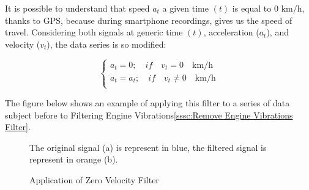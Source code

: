 \documentclass[tesi]{subfiles}
\begin{document}
It is possible to  understand that speed $a_{t}$ a given time $(t)$ is equal to $0$ $\si{\km\per\hour}$, thanks to GPS, because during smartphone recordings, gives us the speed of travel.
Considering both signals at generic time $(t)$, acceleration ($a_{t}$), and velocity ($v_{t}$), the data series is so modified:
\begin{center}
\[
    \left\{
                \begin{array}{ll}
                  a_{t} = 0; \quad 	if \quad v_{t} = 0 \quad \si{\km\per\hour}\\
                  a_{t} = a_{t}; \quad 	if \quad v_{t} \neq 0 \quad \si{\km\per\hour}\\
                \end{array}
              \right.
\]
\end{center}

The figure below shows an example of applying this filter to a series of data subject before to Filtering Engine Vibrations\ref{sssc:Remove Engine Vibrations Filter}.
\vspace{1.5cm}
\begin{figure}[H]	
\end{figure}
\begin{figure}[H]
\centering
{}

The original signal (a) is represent in blue, the filtered signal is represent in orange (b).

 \caption{Application of Zero Velocity Filter}
  \label{fig:Application of Zero Velocity Filter.}
\end{figure}
\end{document}
